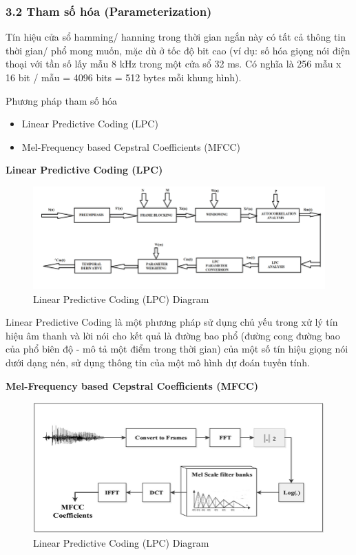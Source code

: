 \documentclass{article}
\begin{document}
	\subsubsection{3.2 Tham số hóa (Parameterization)}
	\qquad Tín hiệu cửa sổ hamming/ hanning trong thời gian ngắn này có tất cả thông tin thời gian/ phổ mong muốn, mặc dù ở tốc độ bit cao (ví dụ: số hóa giọng nói điện thoại với tần số lấy mẫu 8 kHz trong một cửa sổ 32 ms. Có nghĩa là 256 mẫu x 16 bit / mẫu = 4096 bits = 512 bytes mỗi khung hình). 
	
	Phương pháp tham số hóa
	\begin{itemize}
		\item Linear Predictive Coding (LPC) 
		\item Mel-Frequency based Cepstral Coefficients (MFCC)
	\end{itemize}
	\textbf{Linear Predictive Coding (LPC)}
	\begin{figure}[H]
		\centering
		\includegraphics[width=1\linewidth]{images/Block-diagram-of-LPC-Linear-Predictive-Coding.png}
		\caption{Linear Predictive Coding (LPC) Diagram}
		\label{fig:writing-thesis}
	\end{figure}

	Linear Predictive Coding là một phương pháp sử dụng chủ yếu trong xử lý tín hiệu âm thanh và lời nói cho kết quả là đường bao phổ (đường cong đường bao của phổ biên độ - mô tả một điểm trong thời gian) của một số tín hiệu giọng nói dưới dạng nén, sử dụng thông tin của một mô hình dự đoán tuyến tính.

	\textbf{Mel-Frequency based Cepstral Coefficients (MFCC)}
	\begin{figure}[H]
		\centering
		\includegraphics[width=1\linewidth]{images/Extraction-Mel-frequency-cepstral-coefficients-MFCC-from-the-audio-recording-signals.png}
		\caption{Linear Predictive Coding (LPC) Diagram}
		\label{fig:writing-thesis}
	\end{figure}
\end{document}
